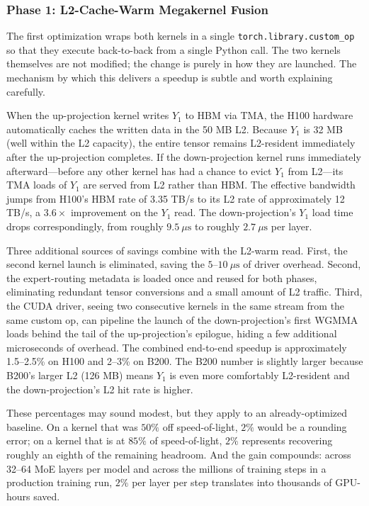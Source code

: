 \documentclass[10pt]{article}
\begin{document}
\subsubsection{Phase 1: L2-Cache-Warm Megakernel Fusion}
The first optimization wraps both kernels in a single \texttt{torch.library.custom\_op} so that they execute back-to-back from a single Python call. The two kernels themselves are not modified; the change is purely in how they are launched. The mechanism by which this delivers a speedup is subtle and worth explaining carefully.

When the up-projection kernel writes $Y_1$ to HBM via TMA, the H100 hardware automatically caches the written data in the 50 MB L2. Because $Y_1$ is 32 MB (well within the L2 capacity), the entire tensor remains L2-resident immediately after the up-projection completes. If the down-projection kernel runs immediately afterward---before any other kernel has had a chance to evict $Y_1$ from L2---its TMA loads of $Y_1$ are served from L2 rather than HBM. The effective bandwidth jumps from H100's HBM rate of 3.35 TB/s to its L2 rate of approximately 12 TB/s, a $3.6\times$ improvement on the $Y_1$ read. The down-projection's $Y_1$ load time drops correspondingly, from roughly $9.5~\mu\text{s}$ to roughly $2.7~\mu\text{s}$ per layer.

Three additional sources of savings combine with the L2-warm read. First, the second kernel launch is eliminated, saving the $5\text{--}10~\mu\text{s}$ of driver overhead. Second, the expert-routing metadata is loaded once and reused for both phases, eliminating redundant tensor conversions and a small amount of L2 traffic. Third, the CUDA driver, seeing two consecutive kernels in the same stream from the same custom op, can pipeline the launch of the down-projection's first WGMMA loads behind the tail of the up-projection's epilogue, hiding a few additional microseconds of overhead. The combined end-to-end speedup is approximately 1.5--2.5\% on H100 and 2--3\% on B200. The B200 number is slightly larger because B200's larger L2 (126 MB) means $Y_1$ is even more comfortably L2-resident and the down-projection's L2 hit rate is higher.

These percentages may sound modest, but they apply to an already-optimized baseline. On a kernel that was $50\%$ off speed-of-light, $2\%$ would be a rounding error; on a kernel that is at $85\%$ of speed-of-light, $2\%$ represents recovering roughly an eighth of the remaining headroom. And the gain compounds: across 32--64 MoE layers per model and across the millions of training steps in a production training run, $2\%$ per layer per step translates into thousands of GPU-hours saved.
\end{document}
